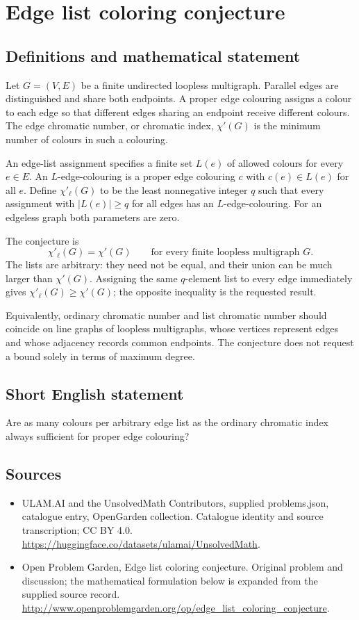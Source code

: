 \documentclass[11pt,a4paper]{article}
\begin{document}
\section*{Edge list coloring conjecture}\label{statement}

\subsection{Definitions and mathematical statement}
Let $G=(V,E)$ be a finite undirected loopless
multigraph. Parallel edges are distinguished
and share both endpoints. A proper edge
colouring assigns a colour to each edge
so that different edges sharing an endpoint
receive different colours. The edge chromatic
number, or chromatic index, $\chi'(G)$ is
the minimum number of colours in such a
colouring.

An edge-list assignment specifies a finite
set $L(e)$ of allowed colours for every
$e\in E$. An $L$-edge-colouring is a proper
edge colouring $c$ with $c(e)\in L(e)$
for all $e$. Define $\chi'_\ell(G)$ to
be the least nonnegative integer $q$ such
that every assignment with $|L(e)|\geq q$
for all edges has an $L$-edge-colouring.
For an edgeless graph both parameters
are zero.

The conjecture is
\[
 \chi'_\ell(G)=\chi'(G)
 \qquad\text{for every finite loopless multigraph }G.
\]
The lists are arbitrary: they need not
be equal, and their union can be much
larger than $\chi'(G)$. Assigning the same
$q$-element list to every edge immediately
gives $\chi'_\ell(G)\geq\chi'(G)$; the
opposite inequality is the requested result.

Equivalently, ordinary chromatic number and
list chromatic number should coincide on
line graphs of loopless multigraphs, whose
vertices represent edges and whose adjacency
records common endpoints. The conjecture
does not request a bound solely in terms
of maximum degree.
\subsection{Short English statement}
Are as many colours per arbitrary edge list as the ordinary chromatic index always sufficient for proper edge colouring?
\subsection{Sources}
\begin{itemize}
\item[S1] ULAM.AI and the UnsolvedMath Contributors, supplied problems.json, catalogue entry, OpenGarden collection. Catalogue identity and source transcription; CC BY 4.0.
\url{https://huggingface.co/datasets/ulamai/UnsolvedMath}.
\item[S2] Open Problem Garden, Edge list coloring conjecture. Original problem and discussion; the mathematical formulation below is expanded from the supplied source record.
\url{http://www.openproblemgarden.org/op/edge_list_coloring_conjecture}.
\end{itemize}
\end{document}
